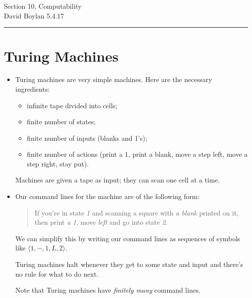 \documentclass[justified]{tufte-handout}
\newcommand{\HRule}{\rule{\linewidth}{0.1mm}}
\begin{document}
\frenchspacing

\begin{fullwidth}
\noindent\Large Section 10, Computability \large \\[.3cm]
\noindent  David Boylan \hfill{5.4.17}

\noindent\HRule
\end{fullwidth}

\section{Turing Machines}

\begin{itemize}

\item Turing machines are very simple machines. Here are the necessary ingredients:

\begin{itemize}

\item infinite tape divided into cells;

\item finite number of states;

\item finite number of inputs (blanks and 1's);


\item finite number of actions (print a 1, print a blank, move a step left, move a step right, stay put).


\end{itemize}

Machines are given a tape as input; they can scan one cell at a time.

\item Our command lines for the machine are of the following form: 

\begin{quote}

If you're in state \emph{1}  and scanning a square with \emph{a blank} printed on it, then print \emph{a 1}, move \emph{left} and go into state \emph{2}.
 
\end{quote}

We can simplify this by writing our command lines as sequences of symbols like $\langle 1,-, 1, L, 2\rangle$.


Turing machines halt whenever they get to some state and input and there's no rule for what to do next.  

Note that Turing machines have \emph{finitely many} command lines.



\end{itemize}
\end{document}
